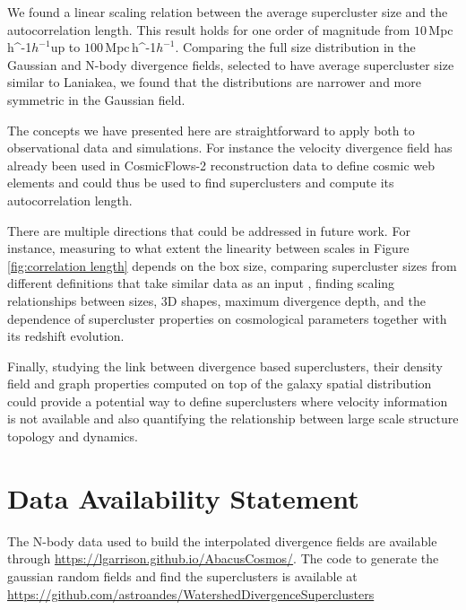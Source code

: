 \documentclass[usenatbib]{mnras}
\newcommand{\Mpch}{\,{\rm Mpc}\,\ifmmode h^{-1}\else $h^{-1}$\fi}
\begin{document}
We found a linear scaling relation between the average supercluster size and the autocorrelation length. 
This result holds for one order of magnitude from $10$\Mpch up to $100$\Mpch.
Comparing the full size distribution in the Gaussian and N-body divergence fields, selected to have average supercluster size similar to Laniakea, we found that the distributions are narrower and more symmetric in the Gaussian field.

The concepts we have presented here are straightforward to apply both to observational data and simulations.
For instance the velocity divergence field has already been used in CosmicFlows-2 reconstruction data to define cosmic web elements \citep{2015MNRAS.452.1052L} and could thus be used to find superclusters and compute its autocorrelation length.


There are multiple directions that could be addressed in future work. 
For instance, measuring to what extent the linearity between scales  in Figure \ref{fig:correlation length} depends on the box size, comparing supercluster sizes from different definitions that take similar data as an input \citep{2020A&A...641A.172E}, finding scaling relationships between sizes, 3D shapes, maximum divergence depth, and the dependence of supercluster properties on cosmological parameters together with its redshift evolution.

Finally, studying the link between divergence based superclusters, their density field \citep{2020A&A...641A.172E}
and graph properties \citep{2020MNRAS.498L.145G}
 computed on top of the galaxy spatial distribution could provide a potential way to define superclusters where velocity information is not available and also quantifying the relationship between large scale structure topology and dynamics.


\section*{Data Availability Statement}
The N-body data used to build the interpolated divergence fields are available through \url{https://lgarrison.github.io/AbacusCosmos/}. 
The code to generate the gaussian random fields and find the superclusters is available at \url{https://github.com/astroandes/WatershedDivergenceSuperclusters}



\end{document}

